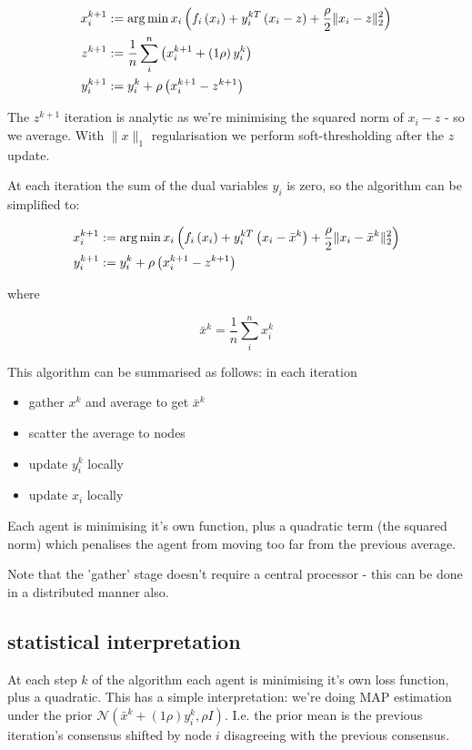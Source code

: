 \documentclass[titlepage]{article}
\begin{document}
\begin{align}
x_i^{k+1} &:= \operatorname*{arg\,min}{x_i} \left(f_i\left( x_i \right) + y_i^{kT}\left(x_i-z\right) + \frac{\rho}{2}\|x_i-z\|_2^2\right)\\
z^{k+1} &:= \frac{1}{n}\sum_i^n \left(x_i^{k+1} + \left(1\rho\right)y_i^k\right)\\
y_i^{k+1} &:= y_i^{k} + \rho \left(x_i^{k+1} - z^{k+1} \right)
\label{consensus_iterations}
\end{align}

The \(z^{k+1}\) iteration is analytic as we're minimising the squared norm of \(x_i - z\) - so we average. With \(\|x\|_1\) regularisation we perform soft-thresholding after the \(z\) update.

At each iteration the sum of the dual variables \(y_i\) is zero, so the algorithm can be simplified to:

\begin{align}
x_i^{k+1} &:= \operatorname*{arg\,min}{x_i} \left(f_i\left( x_i \right) + y_i^{kT}\left(x_i-\bar{x}^k\right) + \frac{\rho}{2}\|x_i-\bar{x}^k\|_2^2\right)\\
y_i^{k+1} &:= y_i^{k} + \rho \left(x_i^{k+1} - z^{k+1} \right)
\label{simple_consensus_iterations}
\end{align}
 
where

\begin{equation}
\bar{x}^k = \frac{1}{n} \sum_i^n x_i^k
\end{equation}

This algorithm can be summarised as follows: in each iteration

\begin{itemize}
\item gather \(x^k\) and average to get \(\bar{x}^k\)
\item scatter the average to nodes
\item update \(y_i^k\) locally
\item update \(x_i\) locally
\end{itemize}

Each agent is minimising it's own function, plus a quadratic term (the squared norm) which penalises the agent from moving too far from the previous average.

Note that the 'gather' stage doesn't require a central processor - this can be done in a distributed manner also.

\subsection{statistical interpretation}
At each step \(k\) of the algorithm each agent is minimising it's own loss function, plus a quadratic.
This has a simple interpretation: we're doing MAP estimation under the prior \(\mathcal{N}\left(\bar{x}^{k} + \left(1\rho\right)y_i^k, \rho I\right)\). I.e. the prior mean is the previous iteration's consensus shifted by node \(i\) disagreeing with the previous consensus. 
\end{document}
